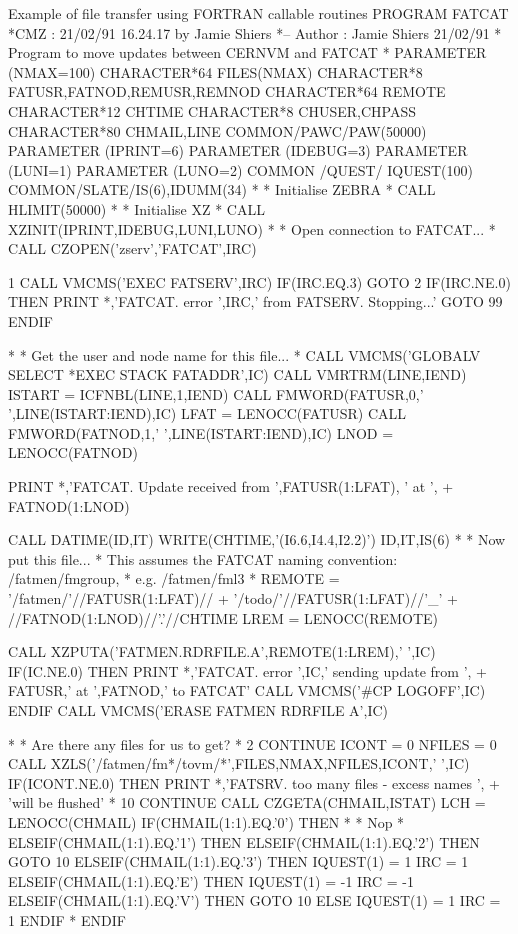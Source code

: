 \begin{XMPt}{Example of file transfer using FORTRAN callable routines}
      PROGRAM FATCAT
*CMZ :          21/02/91  16.24.17  by  Jamie Shiers
*-- Author :    Jamie Shiers   21/02/91
*     Program to move updates between CERNVM and FATCAT
*
      PARAMETER    (NMAX=100)
      CHARACTER*64 FILES(NMAX)
      CHARACTER*8  FATUSR,FATNOD,REMUSR,REMNOD
      CHARACTER*64 REMOTE
      CHARACTER*12 CHTIME
      CHARACTER*8  CHUSER,CHPASS
      CHARACTER*80 CHMAIL,LINE
      COMMON/PAWC/PAW(50000)
      PARAMETER    (IPRINT=6)
      PARAMETER    (IDEBUG=3)
      PARAMETER    (LUNI=1)
      PARAMETER    (LUNO=2)
      COMMON /QUEST/ IQUEST(100)
      COMMON/SLATE/IS(6),IDUMM(34)
*
*     Initialise ZEBRA
*
      CALL HLIMIT(50000)
*
*     Initialise XZ
*
      CALL XZINIT(IPRINT,IDEBUG,LUNI,LUNO)
*
*     Open connection to FATCAT...
*
      CALL CZOPEN('zserv','FATCAT',IRC)

    1 CALL VMCMS('EXEC FATSERV',IRC)
      IF(IRC.EQ.3) GOTO 2
      IF(IRC.NE.0) THEN
         PRINT *,'FATCAT. error ',IRC,' from FATSERV. Stopping...'
         GOTO 99
      ENDIF

*
*     Get the user and node name for this file...
*
      CALL VMCMS('GLOBALV SELECT *EXEC STACK FATADDR',IC)
      CALL VMRTRM(LINE,IEND)
      ISTART = ICFNBL(LINE,1,IEND)
      CALL FMWORD(FATUSR,0,' ',LINE(ISTART:IEND),IC)
      LFAT   = LENOCC(FATUSR)
      CALL FMWORD(FATNOD,1,' ',LINE(ISTART:IEND),IC)
      LNOD   = LENOCC(FATNOD)

      PRINT *,'FATCAT. Update received from ',FATUSR(1:LFAT), ' at ',
     +         FATNOD(1:LNOD)

      CALL DATIME(ID,IT)
      WRITE(CHTIME,'(I6.6,I4.4,I2.2)') ID,IT,IS(6)
*
*    Now put this file...
*    This assumes the FATCAT naming convention: /fatmen/fmgroup,
*                                          e.g. /fatmen/fml3
*
      REMOTE = '/fatmen/'//FATUSR(1:LFAT)//
     +         '/todo/'//FATUSR(1:LFAT)//'_'
     +         //FATNOD(1:LNOD)//'.'//CHTIME
      LREM   = LENOCC(REMOTE)

      CALL XZPUTA('FATMEN.RDRFILE.A',REMOTE(1:LREM),' ',IC)
      IF(IC.NE.0) THEN
         PRINT *,'FATCAT. error ',IC,' sending update from ',
     +            FATUSR,' at ',FATNOD,' to FATCAT'
         CALL VMCMS('#CP LOGOFF',IC)
      ENDIF
      CALL VMCMS('ERASE FATMEN RDRFILE A',IC)

*
*     Are there any files for us to get?
*
    2 CONTINUE
      ICONT  = 0
      NFILES = 0
      CALL XZLS('/fatmen/fm*/tovm/*',FILES,NMAX,NFILES,ICONT,' ',IC)
      IF(ICONT.NE.0) THEN
         PRINT *,'FATSRV. too many files - excess names ',
     +   'will be flushed'
*
   10    CONTINUE
         CALL CZGETA(CHMAIL,ISTAT)
         LCH = LENOCC(CHMAIL)
         IF(CHMAIL(1:1).EQ.'0') THEN
*
*        Nop
*
         ELSEIF(CHMAIL(1:1).EQ.'1') THEN
         ELSEIF(CHMAIL(1:1).EQ.'2') THEN
            GOTO 10
         ELSEIF(CHMAIL(1:1).EQ.'3') THEN
            IQUEST(1) = 1
            IRC = 1
         ELSEIF(CHMAIL(1:1).EQ.'E') THEN
            IQUEST(1) = -1
            IRC = -1
         ELSEIF(CHMAIL(1:1).EQ.'V') THEN
            GOTO 10
         ELSE
            IQUEST(1) = 1
            IRC = 1
         ENDIF
*
      ENDIF



\end{XMPt}
